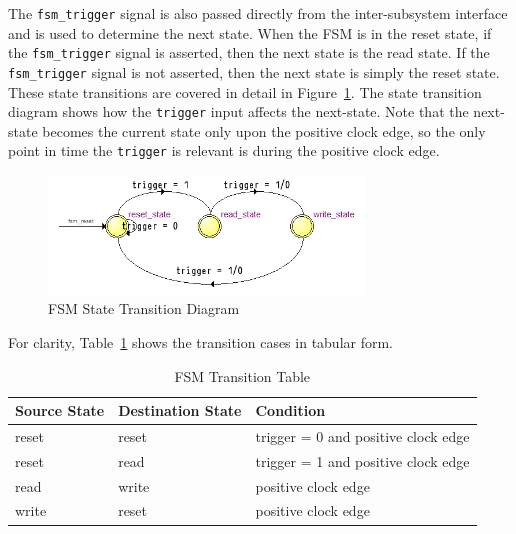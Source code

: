 \documentclass{article}
\begin{document}
The \texttt{fsm\_trigger} signal is also passed directly from the inter-subsystem interface and is used to determine the next state. When the FSM is in the reset state, if the \texttt{fsm\_trigger} signal is asserted, then the next state is the read state. If the \texttt{fsm\_trigger} signal is not asserted, then the next state is simply the reset state. These state transitions are covered in detail in Figure~\ref{fig:fsm-transition}. The state transition diagram shows how the \texttt{trigger} input affects the next-state. Note that the next-state becomes the current state only upon the positive clock edge, so the only point in time the \texttt{trigger} is relevant is during the positive clock edge.

\begin{figure}[ht!]
  \centering
  	\includegraphics[width=0.75\textwidth]{fsm_updated_state_transition_diagram.PNG}
  \caption{FSM State Transition Diagram}
  \label{fig:fsm-transition}
\end{figure}

For clarity, Table~\ref{tab:fsm-table} shows the transition cases in tabular form.

\begin{table}[ht]
    \begin{center}
        \begin{tabular}{lll}\hline
        Source State & Destination State & Condition \\
        \hline
        reset & reset & trigger = 0 and positive clock edge \\
        \hline
        reset & read & trigger = 1 and positive clock edge \\
        \hline
        read & write & positive clock edge \\
        \hline
        write & reset & positive clock edge \\
        \hline
        \end{tabular}
        \caption{FSM Transition Table}\label{tab:fsm-table}
    \end{center}
\end{table}
\end{document}
